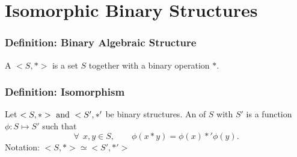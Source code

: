 \section{Isomorphic Binary Structures}

\subsubsection*{Definition: Binary Algebraic Structure}
A  $<S,*>$ is a set $S$ together with a binary operation $*$.

\subsubsection*{Definition: Isomorphism}
Let $<S,*> \operatorname{~\text{and}~} <S',*'$ be binary structures. An  of $S$ with $S'$ is a  function $\phi: S \mapsto S'$ such that
\[
    \forall~~ x,y \in S, \qquad \phi(x*y) = \phi(x) *' \phi(y).
\]
Notation: $<S,*> \simeq <S',*'>$